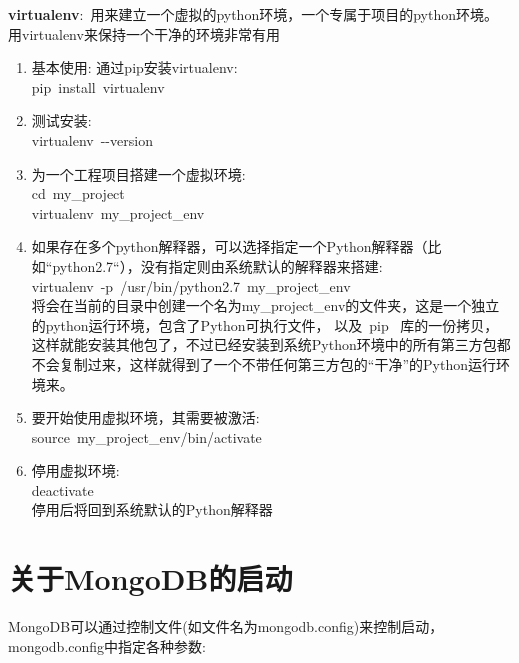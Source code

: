 \documentclass[10pt,a4paper]{article}
\begin{document}
\textbf{virtualenv}:~用来建立一个虚拟的\textrm{python}环境，一个专属于项目的\textrm{python}环境。
用\textrm{virtualenv}来保持一个干净的环境非常有用
\begin{enumerate}
	\item 基本使用: 通过\textrm{pip}安装\textrm{virtualenv}:\\
		\textrm{pip~install~virtualenv}
	\item 测试安装:\\
		\textrm{virtualenv~-\/-version}
	\item 为一个工程项目搭建一个虚拟环境:\\
		\textrm{cd~my\_project}\\
		\textrm{virtualenv~my\_project\_env}
	\item 如果存在多个\textrm{python}解释器，可以选择指定一个\textrm{Python}解释器（比如``\textrm{python2.7}``），没有指定则由系统默认的解释器来搭建:\\
		\textrm{virtualenv~-p~/usr/bin/python2.7~my\_project\_env}\\
		将会在当前的目录中创建一个名为\textrm{my\_project\_env}的文件夹，这是一个独立的\textrm{python}运行环境，包含了\textrm{Python}可执行文件， 以及~\textrm{pip}~ 库的一份拷贝，这样就能安装其他包了，不过已经安装到系统\textrm{Python}环境中的所有第三方包都不会复制过来，这样就得到了一个不带任何第三方包的“干净”的\textrm{Python}运行环境来。
	\item 要开始使用虚拟环境，其需要被激活:\\
		\textrm{source~my\_project\_env/bin/activate}
	\item 停用虚拟环境:\\
		\textrm{deactivate}\\
		停用后将回到系统默认的\textrm{Python}解释器
\end{enumerate}

\section{关于\textrm{MongoDB}的启动}
\textrm{MongoDB}可以通过控制文件(如文件名为\textrm{mongodb.config})来控制启动，\textrm{mongodb.config}中指定各种参数:\\
\end{document}
